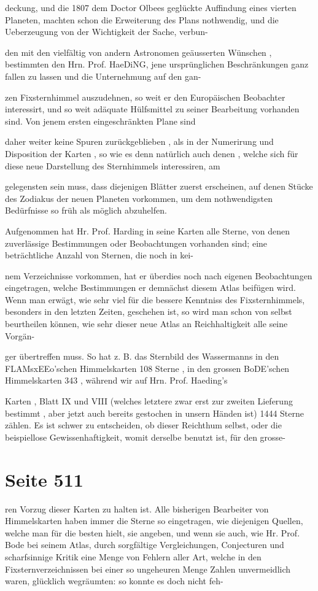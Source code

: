 \documentclass[10pt,a4paper]{article}
\begin{document}
deckung, und die 1807 dem Doctor Olbees geglückte Auffindung eines vierten Planeten, machten schon die Erweiterung des Plans nothwendig, und die Ueberzeugung von der Wichtigkeit der Sache, verbun-

den mit den vielfältig von andern Astronomen geäusserten Wünschen , bestimmten den Hrn. Prof. HaeDiNG, jene ursprünglichen Beschränkungen ganz fallen zu lassen und die Unternehmung auf den gan-

zen Fixsternhimmel auszudehnen, so weit er den Europäischen Beobachter interessirt, und so weit adäquate Hülfsmittel zu seiner Bearbeitung vorhanden sind. Von jenem ersten eingeschränkten Plane sind

daher weiter keine Spuren zurückgeblieben , als in der Numerirung und Disposition der Karten , so wie es denn natürlich auch denen , welche sich für diese neue Darstellung des Sternhimmels interessiren, am

gelegensten sein muss, dass diejenigen Blätter zuerst erscheinen, auf denen Stücke des Zodiakus der neuen Planeten vorkommen, um dem nothwendigsten Bedürfnisse so früh als möglich abzuhelfen.

Aufgenommen hat Hr. Prof. Harding in seine Karten alle Sterne, von denen zuverlässige Bestimmungen oder Beobachtungen vorhanden sind; eine beträchtliche Anzahl von Sternen, die noch in kei-

nem Verzeichnisse vorkommen, hat er überdies noch nach eigenen Beobachtungen eingetragen, welche Bestimmungen er demnächst diesem Atlas beifügen wird. Wenn man erwägt, wie sehr viel für die bessere Kenntniss des Fixsternhimmels, besonders in den letzten Zeiten, geschehen ist, so wird man schon von selbst beurtheilen können, wie sehr dieser neue Atlas an Reichhaltigkeit alle seine Vorgän-

ger übertreffen muss. So hat z. B. das Sternbild des Wassermanns in den FLAMsxEEo'schen Himmelskarten 108 Sterne , in den grossen BoDE'schen Himmelskarten 343 , während wir auf Hrn. Prof. Haeding's

Karten , Blatt IX und VIII (welches letztere zwar erst zur zweiten Lieferung bestimmt , aber jetzt auch bereits gestochen in unsern Händen ist) 1444 Sterne zählen. Es ist schwer zu entscheiden, ob dieser Reichthum selbst, oder die beispiellose Gewissenhaftigkeit, womit derselbe benutzt ist, für den grosse-


\newpage
\section*{Seite 511}
ren Vorzug dieser Karten zu halten ist. Alle bisherigen Bearbeiter von Himmelskarten haben immer die Sterne so eingetragen, wie diejenigen Quellen, welche man für die besten hielt, sie angeben, und wenn sie auch, wie Hr. Prof. Bode bei seinem Atlas, durch sorgfältige Vergleichungen, Conjecturen und scharfsinnige Kritik eine Menge von Fehlern aller Art, welche in den Fixsternverzeichnissen bei einer so ungeheuren Menge Zahlen unvermeidlich waren, glücklich wegräumten: so konnte es doch nicht feh-
\end{document}
